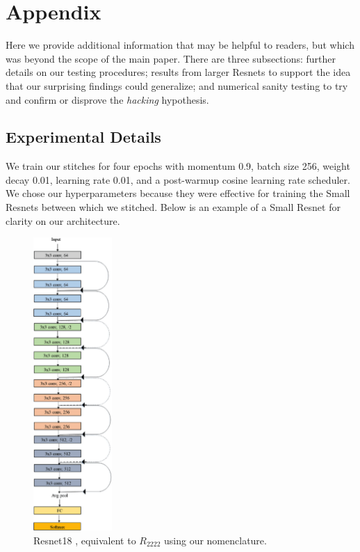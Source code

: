 \documentclass{article}
\begin{document}
\section{Appendix}
Here we provide additional information that may be helpful to readers, but which was
beyond the scope of the main paper. There are three subsections: further details on our
testing procedures; results from larger Resnets to support the idea that our surprising findings
could generalize; and numerical sanity testing to try and confirm or disprove the \textit{hacking}
hypothesis.
\subsection*{Experimental Details}
We train our stitches for four epochs with momentum 0.9,
batch size 256, weight decay 0.01, learning rate 0.01, and 
a post-warmup cosine learning rate scheduler. We chose our
hyperparameters because they were effective for training the
Small Resnets between which we stitched. Below is an example of
a Small Resnet for clarity on our architecture.
\begin{center}
  \begin{figure}[H]
     \centering
     \includegraphics[width=3cm]{resnet18-arch.png}
     \caption{Resnet18 \cite{He2016DeepRL}, equivalent to $R_{2222}$
     using our nomenclature.}
  \end{figure}
\end{center}
\end{document}
